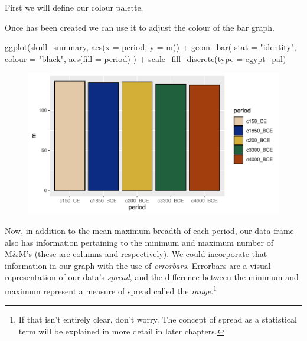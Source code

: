 

First we will define our colour palette.


\vspace{1em}

Once  has been created we can use it to adjust the colour of the bar graph.

\begin{inR}
ggplot(skull_summary, aes(x = period, y = m)) +
  geom_bar(
    stat = "identity",
    colour = "black",
    aes(fill = period)
  ) +
  scale_fill_discrete(type = egypt_pal)
\end{inR}

\vspace{2em}

\begin{figure}[H]
\includegraphics[scale = .75]{graphics/ch3Figs/bar_2.pdf}
\end{figure}

Now, in addition to the mean maximum breadth of each period, our data frame also has information pertaining to the minimum and maximum number of M\&M's (these are columns  and  respectively). We could incorporate that information in our graph with the use of \textit{errorbars}.  Errorbars are a visual representation of our data's \textit{spread}, and the difference between the minimum and maximum represent a measure of spread called the \textit{range}.\footnote{If that isn't entirely clear, don't worry. The concept of spread as a statistical term will be explained in more detail in later chapters.}

